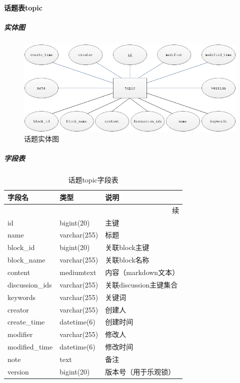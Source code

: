 \documentclass[titlepage,UTF8,linespread=1.5]{ctexart}
\begin{document}
\paragraph{话题表topic}
\subparagraph{实体图}
\begin{figure}[H]
    \centering
    \includegraphics[width=140mm]{entity-topic.png}
    \caption{话题实体图}
    \label{fig:entity-topic}
\end{figure}
\subparagraph{字段表}
\begin{longtable}{|p{10em}|p{6em}|p{15em}|}
    \caption{话题topic字段表}\label{tab:table_topic}        \\\hline
    字段名          & 类型         & 说明                   \\\hline
    \endfirsthead
    \multicolumn{3}{r}{{续\tablename\thetable{}}}           \\\hline
    \endhead
    id              & bigint(20)   & 主键                   \\\hline
    name            & varchar(255) & 标题                   \\\hline
    block\_id       & bigint(20)   & 关联block主键          \\\hline
    block\_name     & varchar(255) & 关联block名称          \\\hline
    content         & mediumtext   & 内容（markdown文本）   \\\hline
    discussion\_ids & varchar(255) & 关联discussion主键集合 \\\hline
    keywords        & varchar(255) & 关键词                 \\\hline
    creator         & varchar(255) & 创建人                 \\\hline
    create\_time    & datetime(6)  & 创建时间               \\\hline
    modifier        & varchar(255) & 修改人                 \\\hline
    modified\_time  & datetime(6)  & 修改时间               \\\hline
    note            & text         & 备注                   \\\hline
    version         & bigint(20)   & 版本号（用于乐观锁）   \\\hline
\end{longtable}\par
\end{document}
